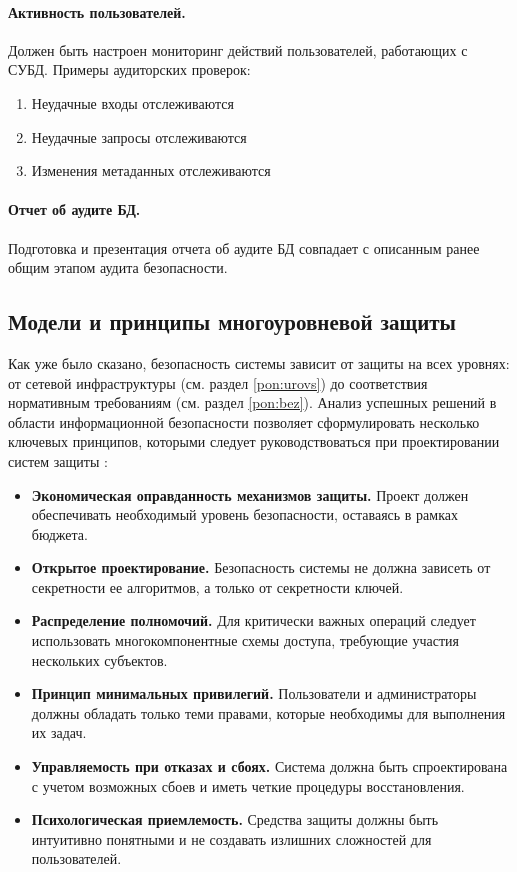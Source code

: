 \paragraph{Активность пользователей.}

Должен быть настроен мониторинг действий пользователей, работающих с СУБД. Примеры аудиторских проверок:

\begin{enumerate}
	\item Неудачные входы отслеживаются
	\item Неудачные запросы отслеживаются
	\item Изменения метаданных отслеживаются
\end{enumerate}

\paragraph{Отчет об аудите БД.}

Подготовка и презентация отчета об аудите БД совпадает с описанным ранее общим этапом аудита безопасности.

\clearpage

\subsection{Модели и принципы многоуровневой защиты}
Как уже было сказано, безопасность системы зависит от защиты на всех уровнях: от сетевой инфраструктуры (см. раздел \ref{pon:urovs}) до соответствия нормативным требованиям (см. раздел \ref{pon:bez}). Анализ успешных решений в области информационной безопасности позволяет сформулировать несколько ключевых принципов, которыми следует руководствоваться при проектировании систем защиты \autocite{Smirnov2007}:
\begin{itemize}
	\item \textbf{Экономическая оправданность механизмов защиты.} Проект должен обеспечивать необходимый уровень безопасности, оставаясь в рамках бюджета.
	\item \textbf{Открытое проектирование.} Безопасность системы не должна зависеть от секретности ее алгоритмов, а только от секретности ключей.
	\item \textbf{Распределение полномочий.} Для критически важных операций следует использовать многокомпонентные схемы доступа, требующие участия нескольких субъектов.
	\item \textbf{Принцип минимальных привилегий.} Пользователи и администраторы должны обладать только теми правами, которые необходимы для выполнения их задач.
	\item \textbf{Управляемость при отказах и сбоях.} Система должна быть спроектирована с учетом возможных сбоев и иметь четкие процедуры восстановления.
	\item \textbf{Психологическая приемлемость.} Средства защиты должны быть интуитивно понятными и не создавать излишних сложностей для пользователей.
\end{itemize}

